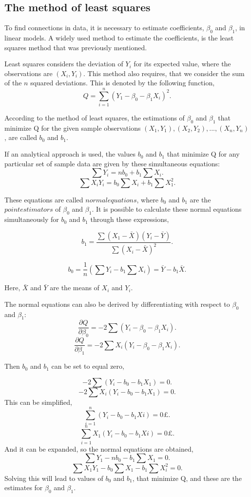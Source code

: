 \subsection{The method of least squares}
To find connections in data, it is necessary to estimate coefficients, $\beta_0$ and $\beta_1$, in linear models. 
A widely used method to estimate the coefficients, is the least squares method that was previously mentioned. 

\noindent Least squares considers the deviation of $Y_i$ for  its expected value, where the observations are $(X_i, Y_i)$. 
This method also requires, that we consider the sum of the $n$ squared deviations.
This is denoted by the following function,
$$Q=\sum_{i=1}^{n}(Y_1-\beta_0 - \beta_1 X_i)^2 .$$

\noindent According to the method of least squares, the estimations of $\beta_0$ and $\beta_1$ that minimize Q for the given sample observations $(X_1,Y_1), (X_2,Y_2), ..., (X_n,Y_n)$, are called $b_0$ and $b_1$.  

\noindent If an analytical approach is used, the values $b_0$ and $b_1$ that minimize Q for any particular set of sample data are given by these simultaneous equations: 
$$\sum Y_i =n b_0 +b_1 \sum X_i .$$
$$\sum X_i Y_i = b_0 \sum X_i + b_1 \sum X_1^2 .$$

\noindent These equations are called $normal equations$, where $b_0$ and $b_1$ are the $point estimators$ of $\beta_0$ and $\beta_1$. It is possible to calculate these normal equations simultaneously for $b_0$ and $b_1$ through these expressions,

$$b_1 = \frac{\sum (X_1 - \bar{X}) (Y_i - \bar{Y})}{\sum (X_i - \bar{X})^2} .$$

$$b_0 = \frac{1}{n} (\sum Y_i - b_1 \sum X_i ) = \bar{Y} - b_1 \bar{X} .$$

\noindent Here, $\bar{X}$ and $\bar{Y}$ are the means of $X_i$ and $Y_i$.

\noindent The normal equations can also be derived by differentiating with respect to $\beta_0$ and $\beta_1$:
$$\frac{\partial Q}{\partial \beta_0}=-2 \sum (Y_i - \beta_0 - \beta_1 X_i) .$$
$$\frac{\partial Q} {\partial \beta_1} = -2 \sum X_i (Y_i - \beta_0 - \beta_1 X_i) .$$

\noindent Then $b_0$ and $b_1$ can be set to equal zero, 

$$-2 \sum (Y_i - b_0 - b_1 X_1)=0 .$$
$$-2\sum X_i(Y_i - b_0 - b_1 X_1)=0 .$$
This can be simplified, 
$$\sum_{i=1}^{n} (Y_i - b_0 - b_1 Xi)=0£ .$$
$$\sum_{i=1}^{n} X_1(Y_i - b_0 - b_1 Xi)=0£ .$$
And it can be expanded, so the normal equations are obtained, 
$$\sum Y_1 - n b_0 - b_1 \sum X_1 =0 .$$
$$\sum X_1 Y_1  - b_0 \sum X_1 - b_1 \sum X_i^2 =0 .$$
Solving this will lead to values of $b_0$ and $b_1$, that minimize Q, and these are the estimates for $\beta_0$ and $\beta_1$. 

